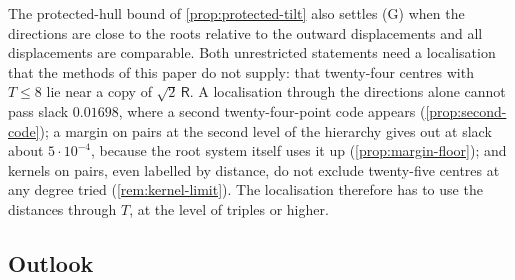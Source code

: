 \documentclass[11pt,reqno]{amsart}
\renewcommand{\_}{\origunderscore\allowbreak}
\numberwithin{equation}{section}
\theoremstyle{plain}
\theoremstyle{definition}
\theoremstyle{remark}
\newcommand{\Rt}{\mathsf{R}}                 %
\begin{document}
The protected-hull bound of \cref{prop:protected-tilt} also settles (G)
when the directions are close to the roots relative to the outward
displacements and all displacements are comparable.
Both unrestricted statements need a localisation that the methods of this paper do not
supply: that twenty-four centres with $T\le8$ lie near a copy of
$\sqrt2\,\Rt$. A localisation through the directions alone cannot pass slack
$0.01698$, where a second twenty-four-point code appears
(\cref{prop:second-code}); a margin on pairs at the second level of the
hierarchy gives out at slack about $5\cdot10^{-4}$, because the root system
itself uses it up (\cref{prop:margin-floor}); and kernels on pairs, even
labelled by distance, do not exclude twenty-five centres at any degree
tried (\cref{rem:kernel-limit}). The localisation therefore has to use the
distances through $T$, at the level of triples or higher.

\subsection{Outlook}
\end{document}
